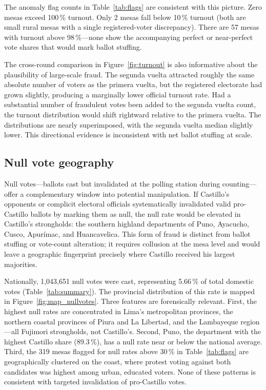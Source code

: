 \documentclass[12pt]{article}
\begin{document}
The anomaly flag counts in Table~\ref{tab:flags} are consistent with this
picture. Zero mesas exceed 100\,\% turnout. Only 2 mesas fall below 10\,\%
turnout (both are small rural mesas with a single registered-voter
discrepancy). There are 57 mesas with turnout above 98\,\%---none show
the accompanying perfect or near-perfect vote shares that would mark
ballot stuffing.

The cross-round comparison in Figure~\ref{fig:turnout} is also informative
about the plausibility of large-scale fraud. The segunda vuelta attracted
roughly the same absolute number of voters as the primera vuelta, but the
registered electorate had grown slightly, producing a marginally lower
official turnout rate. Had a substantial number of fraudulent votes been
added to the segunda vuelta count, the turnout distribution would shift
rightward relative to the primera vuelta. The distributions are nearly
superimposed, with the segunda vuelta median slightly lower. This
directional evidence is inconsistent with net ballot stuffing at scale.

\subsection{Null vote geography}

Null votes---ballots cast but invalidated at the polling station during
counting---offer a complementary window into potential manipulation. If
Castillo's opponents or complicit electoral officials systematically
invalidated valid pro-Castillo ballots by marking them as null, the null
rate would be elevated in Castillo's strongholds: the southern highland
departments of Puno, Ayacucho, Cusco, Apur\'imac, and Huancavelica. This
form of fraud is distinct from ballot stuffing or vote-count alteration; it
requires collusion at the mesa level and would leave a geographic fingerprint
precisely where Castillo received his largest majorities.

Nationally, 1,043,651 null votes were cast, representing 5.66\,\% of total
domestic votes (Table~\ref{tab:summary}). The provincial distribution of this
rate is mapped in Figure~\ref{fig:map_nullvotes}. Three features are
forensically relevant. First, the highest null rates are concentrated in
Lima's metropolitan provinces, the northern coastal provinces of Piura and
La Libertad, and the Lambayeque region---all Fujimori strongholds, not
Castillo's. Second, Puno, the department with the highest Castillo share
(89.3\,\%), has a null rate near or below the national average. Third, the
319 mesas flagged for null rates above 30\,\% in Table~\ref{tab:flags} are
geographically clustered on the coast, where protest voting against both
candidates was highest among urban, educated voters. None of these patterns
is consistent with targeted invalidation of pro-Castillo votes.
\end{document}
